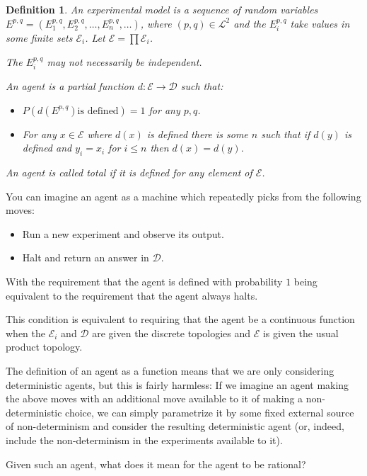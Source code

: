 \documentclass[a4paper]{book}
\newtheorem{definition}{Definition}
\begin{document}
\begin{definition}
An experimental model is a sequence of random variables 
$E^{p, q} = (E^{p, q}_1, E^{p, q}_2, \ldots, E^{p, q}_n, \ldots)$, where
$(p, q) \in \mathcal{L}^2$ and the $E^{p, q}_i$ take values in some finite
sets $\mathcal{E}_i$. Let $\mathcal{E} = \prod \mathcal{E}_i$.

The $E^{p, q}_i$ may not necessarily be independent.

An agent is a partial function
$d: \mathcal{E} \to \mathcal{D}$ such that:

\begin{itemize}
\item $P(d(E^{p, q}) \text{is defined}) = 1$ for any $p, q$.
\item For any $x \in \mathcal{E}$ where $d(x)$ is defined
there is some $n$ such that if $d(y)$ is defined and $y_i = x_i$
for $i \leq n$ then $d(x) = d(y)$.
\end{itemize}

An agent is called total if it is defined for any element of $\mathcal{E}$.
\end{definition}

You can imagine an agent as a machine which repeatedly picks from the
following moves:

\begin{itemize}
\item Run a new experiment and observe its output.
\item Halt and return an answer in $\mathcal{D}$.
\end{itemize}

With the requirement that the agent is defined with probability $1$ being
equivalent to the requirement that the agent always halts.

This condition is equivalent to requiring that the agent be a continuous
function when the $\mathcal{E}_i$
and $\mathcal{D}$
are given the discrete topologies and $\mathcal{E}$
is given the usual product topology.

The definition of an agent as a function means that we are only considering
deterministic agents, but this is fairly harmless: If we imagine an agent
making the above moves with an additional move available to it of making
a non-deterministic choice, we can simply parametrize it by some fixed
external source of non-determinism and consider the resulting deterministic
agent (or, indeed, include the non-determinism in the experiments available
to it).

Given such an agent, what does it mean for the agent to be rational?
\end{document}
